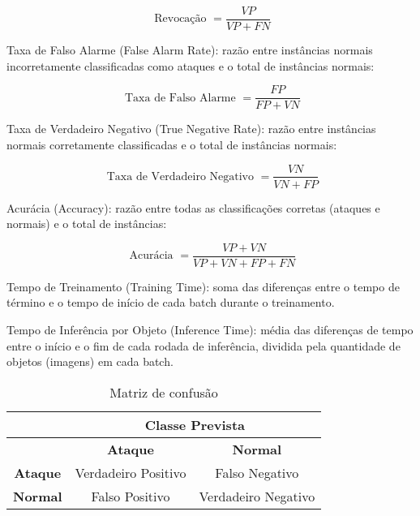 \documentclass[conference]{IEEEtran}
\begin{document}
{    \begin{equation}
    \text { Revocação }=\frac{V P}{V P+F N}
    \end{equation}
    \hspace{1cm}
    
    Taxa de Falso Alarme (False Alarm Rate): razão entre instâncias normais incorretamente classificadas como ataques e o total de instâncias normais:

    \begin{equation}
    \text { Taxa de Falso Alarme }=\frac{F P}{F P+V N}
    \end{equation}
    \hspace{1cm}
    
    Taxa de Verdadeiro Negativo (True Negative Rate): razão entre instâncias normais corretamente classificadas e o total de instâncias normais:

    \begin{equation}
    \text { Taxa de Verdadeiro Negativo }=\frac{V N}{V N+F P}
    \end{equation}
    \hspace{1cm}
    
    Acurácia (Accuracy): razão entre todas as classificações corretas (ataques e normais) e o total de instâncias:

    \begin{equation}
    \text { Acurácia }=\frac{V P+V N}{V P+V N+F P+F N}
    \end{equation}
    \hspace{1cm}

    Tempo de Treinamento (Training Time): soma das diferenças entre o tempo de término e o tempo de início de cada batch durante o treinamento.
    
    Tempo de Inferência por Objeto (Inference Time): média das diferenças de tempo entre o início e o fim de cada rodada de inferência, dividida pela quantidade de objetos (imagens) em cada batch.
    

    \begin{table}[h]
        \centering
        \renewcommand{\arraystretch}{1.4}
        \begin{tabular}{|c|c|c|}
            \hline
            \rowcolor{gray!30}
            \multicolumn{1}{|c|}{} & \multicolumn{2}{c|}{\textbf{Classe Prevista}} \\ \hline
            \rowcolor{gray!30}
            \textbf & \textbf{Ataque} & \textbf{Normal} \\ \hline
            \textbf{Ataque} & Verdadeiro Positivo & Falso Negativo \\ \hline
            \textbf{Normal} & Falso Positivo & Verdadeiro Negativo \\ \hline
        \end{tabular}
        \caption{Matriz de confusão}
        \label{tab:matriz-confusao}
    \end{table}


}
\end{document}
